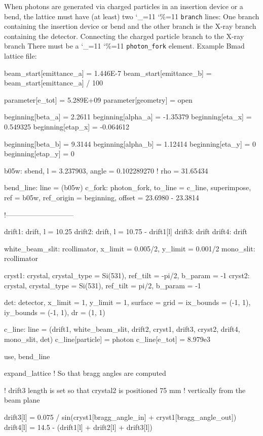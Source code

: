 \documentclass[11pt]{article}
\newcommand\ttcmd{\begingroup\catcode`\_=11 \catcode`\%=11 \dottcmd}
\newcommand\dottcmd[1]{\texttt{#1}\endgroup}
\newcommand{\vn}{\ttcmd}
\begin{document}
{{{{{{{{{{When photons are generated via charged particles in an insertion
device or a bend, the lattice must have (at least) two \vn{branch}
lines: One branch containing the insertion device or bend and the
other branch is the X-ray branch containing the detector. Connecting the
charged particle branch to the X-ray branch There must be a
\vn{photon_fork} element.  Example Bmad lattice file:

\begin{listing}{1}
beam_start[emittance_a] = 1.446E-7
beam_start[emittance_b] = beam_start[emittance_a] / 100

parameter[e_tot] = 5.289E+09
parameter[geometry] = open

beginning[beta_a]  =  2.2611   
beginning[alpha_a] = -1.35379
beginning[eta_x]   =  0.549325
beginning[etap_x]  = -0.064612

beginning[beta_b]  = 9.3144
beginning[alpha_b] = 1.12414
beginning[eta_y]   = 0
beginning[etap_y]  = 0

b05w: sbend, l = 3.237903, angle = 0.102289270 ! rho =  31.65434

bend_line: line = (b05w)
c_fork: photon_fork, to_line = c_line, superimpose, 
        ref = b05w, ref_origin = beginning, offset =  23.6980 - 23.3814

!-----------------------------

drift1: drift, l = 10.25
drift2: drift, l = 10.75 - drift1[l]
drift3: drift
drift4: drift

white_beam_slit: rcollimator, x_limit = 0.005/2, y_limit = 0.001/2
mono_slit: rcollimator

cryst1: crystal, crystal_type = Si(531), ref_tilt = -pi/2, b_param = -1
cryst2: crystal, crystal_type = Si(531), ref_tilt = pi/2, b_param = -1

det: detector, x_limit = 1, y_limit = 1, 
     surface = {grid = {ix_bounds = (-1, 1), iy_bounds = (-1, 1), dr = (1, 1)}}

c_line: line = (drift1, white_beam_slit, drift2, cryst1, drift3, 
                cryst2, drift4, mono_slit, det)
c_line[particle] = photon
c_line[e_tot] = 8.979e3

use, bend_line

expand_lattice  ! So that bragg angles are computed

! drift3 length is set so that crystal2 is positioned 75 mm 
! vertically from the beam plane

drift3[l] = 0.075 / sin(cryst1[bragg_angle_in] + cryst1[bragg_angle_out])
drift4[l] = 14.5 - (drift1[l] + drift2[l] + drift3[l])
\end{listing}

}}}}}}}}}}
\end{document}
